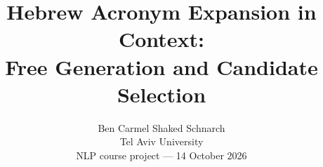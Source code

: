 \documentclass[11pt]{article}
\title{Hebrew Acronym Expansion in Context:\\Free Generation and Candidate Selection}
\author{Ben Carmel \quad Shaked Schnarch \\
Tel Aviv University \\
\small NLP course project --- 14 October 2026}
\begin{document}
\maketitle
\begin{abstract}

\end{abstract}







\label{bodyend}

\clearpage
\appendix

\clearpage

\end{document}
